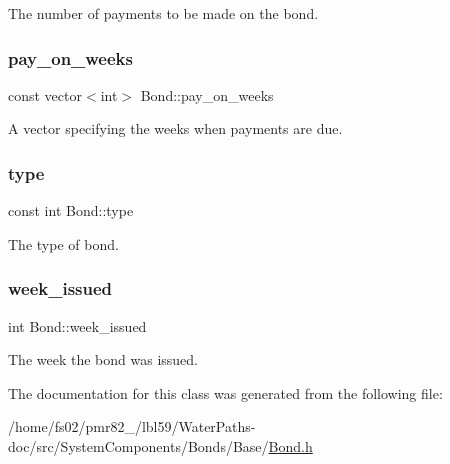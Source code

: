 The number of payments to be made on the bond. 

\mbox{\label{classBond_ae8dd46fcbf95c993460ffe4ea1f52739}} 
\subsubsection{\texorpdfstring{pay\+\_\+on\+\_\+weeks}{pay\_on\_weeks}}
{\footnotesize\ttfamily const vector$<$int$>$ Bond\+::pay\+\_\+on\+\_\+weeks}



A vector specifying the weeks when payments are due. 

\mbox{\label{classBond_a48da24878beedd71cbaa990cea860667}} 
\subsubsection{\texorpdfstring{type}{type}}
{\footnotesize\ttfamily const int Bond\+::type}



The type of bond. 

\mbox{\label{classBond_a30d48d158cbbd9c7b4bfa0012c89590a}} 
\subsubsection{\texorpdfstring{week\+\_\+issued}{week\_issued}}
{\footnotesize\ttfamily int Bond\+::week\+\_\+issued\hspace{0.3cm}{\ttfamily [protected]}}



The week the bond was issued. 



The documentation for this class was generated from the following file\+:\begin{DoxyCompactItemize}
\item 
/home/fs02/pmr82\+\_/lbl59/\+Water\+Paths-\/doc/src/\+System\+Components/\+Bonds/\+Base/\mbox{\hyperlink{Bond_8h}{Bond.\+h}}\end{DoxyCompactItemize}
